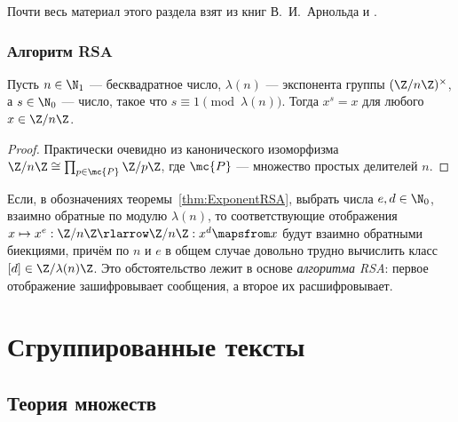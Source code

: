 \documentclass[
	extrafontsizes,
	11pt,
	hyphens,
]{memoir}
\begin{document}
\begin{remark}
Почти весь материал этого раздела взят из книг В.~И.~Арнольда \cite[42]{arnold_mmkm} и \cite[29]{arnold_ponimanie}.
\end{remark}


\section{Алгоритм RSA}

\begin{theorem}
Пусть \(n \in \N_1\) --- бесквадратное число,
\(\lambda(n)\) --- экспонента группы \((\Z / n\Z)^{\times}\),
а \(s \in \N_0\) --- число, такое что \(s \equiv 1 \pmod{\lambda(n)}\).%
\label{thm:ExponentRSA}
Тогда \(x^s = x\) для любого \(x \in \Z / n\Z\).
\end{theorem}

\begin{proof}
Практически очевидно из канонического изоморфизма
\(\Z / n\Z \cong \prod_{p \in \mc{P}} \Z / p\Z\),
где \(\mc{P}\) --- множество простых делителей \(n\).
\end{proof}

\begin{remark}
Если, в обозначениях теоремы~\ref{thm:ExponentRSA}, выбрать числа \(e, d \in \N_0\),
взаимно обратные по модулю \(\lambda(n)\),
то соответствующие отображения
\(x \mapsto x^e : \Z / n\Z \rlarrow \Z / n\Z : x^d \mapsfrom x\)
будут взаимно обратными биекциями,
причём по \(n\) и \(e\) в общем случае довольно трудно вычислить класс \([d] \in \Z / \lambda(n) \Z\).
Это обстоятельство лежит в основе \emph{алгоритма RSA}:
первое отображение зашифровывает сообщения, а второе их расшифровывает.
\end{remark}






\part{Сгруппированные тексты}



\chapter{Теория множеств}


\end{document}
